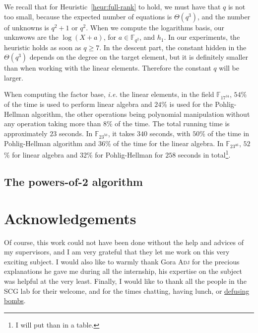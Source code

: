 \documentclass[a4paper,11pt]{article}
\theoremstyle{break}
\theoremstyle{sc}
\theoremstyle{definition}
\theoremstyle{remark}
\newcommand{\ie}{\emph{i.e. }}
\begin{document}
We recall that for Heuristic~\ref{heur:full-rank} to hold, we must have that $q$
is not too small, because the expected number of equations is $\Theta(q^3)$,
and the number of unknowns is $q^2+1$ or $q^2$. When we compute the logarithms
basis, our unknwows are the $\log(X + a)$, for
$a\in\mathbb{F}_{q^2}$, and $h_1$. In our experiments, the heuristic holds as
soon as $q\geq 7$. In the descent part, the constant hidden in the
$\Theta(q^3)$ depends on the degree on the target element, but it is definitely
smaller than when working with the linear elements. Therefore the constant $q$
will be larger.

When computing the factor base, \ie the linear elements, in the field
$\mathbb{F}_{17^{34}}$, $54$\% of the time is used to perform linear algebra and
$24$\% is used for the Pohlig-Hellman algorithm, the other operations being
polynomial manipulation without any operation taking more than $8$\% of the
time. The total running time is approximately $23$ seconds. In
$\mathbb{F}_{23^{50}}$, it takes $340$ seconds, with $50$\% of the time in
Pohlig-Hellman algorithm and $36$\% of the time for the linear algebra. In
$\mathbb{F}_{23^{46}}$, $52$\% for linear algebra and $32$\% for
Pohlig-Hellman for $258$ seconds in total\footnote{I will put than in a table.}.
\subsection{The powers-of-2 algorithm}

\section*{Acknowledgements}

Of course, this work could not have been done without the help and advices of my
supervisors, and I am very grateful that they let me work on this very exciting
subject. I would also like to warmly thank Gora \textsc{Adj} for the
precious explanations he gave me during all the internship, his expertise on the
subject was helpful at the very least. Finally, I would like to thank all the
people in the SCG lab for their welcome, and for the times chatting, having
lunch, or \href{http://www.keeptalkinggame.com/}{defusing bombs}.



\end{document}
